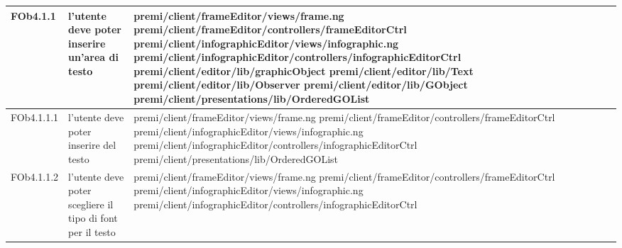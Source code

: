 \begin{longtable}{|l|p{5cm}|p{7cm}|}
FOb4.1.1 & l'utente deve poter inserire un'area di testo & \hspace{0pt}premi/client/frameEditor/views/frame.ng \linebreak \linebreak premi/client/frameEditor/controllers/frameEditorCtrl \linebreak \linebreak premi/client/infographicEditor/views/infographic.ng \linebreak \linebreak premi/client/infographicEditor/controllers/infographicEditorCtrl \linebreak \linebreak premi/client/editor/lib/graphicObject \linebreak \linebreak premi/client/editor/lib/Text \linebreak \linebreak premi/client/editor/lib/Observer \linebreak \linebreak premi/client/editor/lib/GObject \linebreak \linebreak premi/client/presentations/lib/OrderedGOList \\
\hline
FOb4.1.1.1 & l'utente deve poter inserire del testo & \hspace{0pt}premi/client/frameEditor/views/frame.ng \linebreak \linebreak premi/client/frameEditor/controllers/frameEditorCtrl \linebreak \linebreak premi/client/infographicEditor/views/infographic.ng \linebreak \linebreak premi/client/infographicEditor/controllers/infographicEditorCtrl  \linebreak \linebreak premi/client/presentations/lib/OrderedGOList \\
\hline
FOb4.1.1.2 & l'utente deve poter scegliere il tipo di font per il testo & \hspace{0pt}premi/client/frameEditor/views/frame.ng \linebreak \linebreak premi/client/frameEditor/controllers/frameEditorCtrl \linebreak \linebreak premi/client/infographicEditor/views/infographic.ng \linebreak \linebreak premi/client/infographicEditor/controllers/infographicEditorCtrl \\

\end{longtable}
